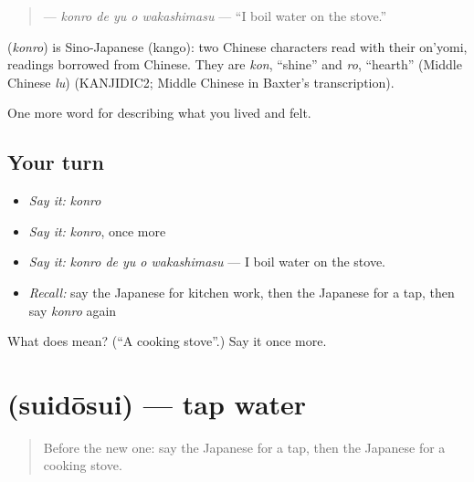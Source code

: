 \begin{quote}
\textbf{  } — \emph{konro de yu o wakashimasu} — \textquotedblleft{}I boil water on the stove.\textquotedblright{}
\end{quote}

\begin{cousinweb}
\textbf{} (\emph{konro}) is Sino-Japanese (kango): two Chinese characters read with their on'yomi, readings borrowed from Chinese. They are \emph{kon}, \textquotedblleft{}shine\textquotedblright{} and \emph{ro}, \textquotedblleft{}hearth\textquotedblright{} (Middle Chinese \emph{lu}) (KANJIDIC2; Middle Chinese in Baxter's transcription).
\end{cousinweb}

\begin{grammarlens}[title={What you've built}]
One more word for describing what you lived and felt.
\end{grammarlens}

\subsection*{Your turn}
\begin{itemize}
\raggedright
  \item \emph{Say it:} \emph{konro}
  \item \emph{Say it:} \emph{konro}, once more
  \item \emph{Say it:} \emph{konro de yu o wakashimasu} — I boil water on the stove.
  \item \emph{Recall:} say the Japanese for kitchen work, then the Japanese for a tap, then say \emph{konro} again
\end{itemize}

\begin{tcolorbox}[breakable,colback=teal!4,colframe=teal!35!black,title={Before you move on}]
What does  mean? (\textquotedblleft{}A cooking stove\textquotedblright{}.) Say it once more.
\end{tcolorbox}
\section[\texorpdfstring{\ja{すいどうすい} (suidōsui)}{すいどうすい (suidōsui)}]{ (suidōsui) — tap water}

\label{lesson:JA-C491-suidousui}



\begin{quote}
Before the new one: say the Japanese for a tap, then the Japanese for a cooking stove.
\end{quote}

